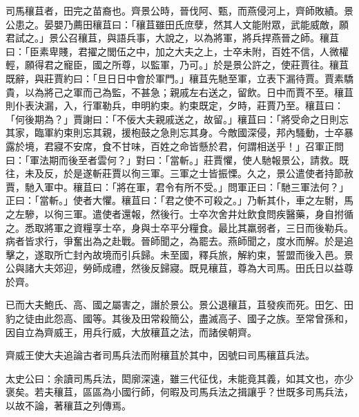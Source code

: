 
\begin{pinyinscope}
司馬穰苴者，田完之苗裔也。齊景公時，晉伐阿、甄，而燕侵河上，齊師敗績。景公患之。晏嬰乃薦田穰苴曰：「穰苴雖田氏庶孽，然其人文能附眾，武能威敵，願君試之。」景公召穰苴，與語兵事，大說之，以為將軍，將兵捍燕晉之師。穰苴曰：「臣素卑賤，君擢之閭伍之中，加之大夫之上，士卒未附，百姓不信，人微權輕，願得君之寵臣，國之所尊，以監軍，乃可。」於是景公許之，使莊賈往。穰苴既辭，與莊賈約曰：「旦日日中會於軍門。」穰苴先馳至軍，立表下漏待賈。賈素驕貴，以為將己之軍而己為監，不甚急；親戚左右送之，留飲。日中而賈不至。穰苴則仆表決漏，入，行軍勒兵，申明約束。約束既定，夕時，莊賈乃至。穰苴曰：「何後期為？」賈謝曰：「不佞大夫親戚送之，故留。」穰苴曰：「將受命之日則忘其家，臨軍約束則忘其親，援枹鼓之急則忘其身。今敵國深侵，邦內騷動，士卒暴露於境，君寢不安席，食不甘味，百姓之命皆懸於君，何謂相送乎！」召軍正問曰：「軍法期而後至者雲何？」對曰：「當斬。」莊賈懼，使人馳報景公，請救。既往，未及反，於是遂斬莊賈以徇三軍。三軍之士皆振慄。久之，景公遣使者持節赦賈，馳入軍中。穰苴曰：「將在軍，君令有所不受。」問軍正曰：「馳三軍法何？」正曰：「當斬。」使者大懼。穰苴曰：「君之使不可殺之。」乃斬其仆，車之左駙，馬之左驂，以徇三軍。遣使者還報，然後行。士卒次舍井灶飲食問疾醫藥，身自拊循之。悉取將軍之資糧享士卒，身與士卒平分糧食。最比其羸弱者，三日而後勒兵。病者皆求行，爭奮出為之赴戰。晉師聞之，為罷去。燕師聞之，度水而解。於是追擊之，遂取所亡封內故境而引兵歸。未至國，釋兵旅，解約束，誓盟而後入邑。景公與諸大夫郊迎，勞師成禮，然後反歸寢。既見穰苴，尊為大司馬。田氏日以益尊於齊。

已而大夫鮑氏、高、國之屬害之，譖於景公。景公退穰苴，苴發疾而死。田乞、田豹之徒由此怨高、國等。其後及田常殺簡公，盡滅高子、國子之族。至常曾孫和，因自立為齊威王，用兵行威，大放穰苴之法，而諸侯朝齊。

齊威王使大夫追論古者司馬兵法而附穰苴於其中，因號曰司馬穰苴兵法。

太史公曰：余讀司馬兵法，閎廓深遠，雖三代征伐，未能竟其義，如其文也，亦少褒矣。若夫穰苴，區區為小國行師，何暇及司馬兵法之揖讓乎？世既多司馬兵法，以故不論，著穰苴之列傳焉。


\end{pinyinscope}